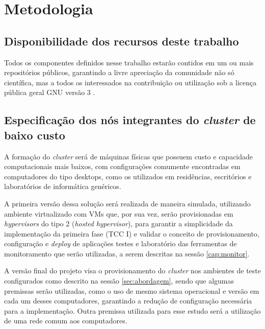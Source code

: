 
\chapter{Metodologia}
\label{chap:metodologia}
\section{Disponibilidade dos recursos deste trabalho}

Todos os componentes definidos nesse trabalho estarão contidos em um ou mais repositórios públicos, garantindo a livre apreciação da comunidade não só científica, mas a todos os interessados na contribuição ou utilização sob a licença pública geral GNU versão 3 \cite{foss2022}.

\section{Especificação dos nós integrantes do  \emph{cluster} de baixo custo}

A formação do  \emph{cluster} será de máquinas físicas que possuem custo e capacidade computacionais mais baixos, com configurações comumente encontradas em computadores do tipo desktops, como os utilizados em residências, escritórios e laboratórios de informática genéricos.

A primeira versão dessa solução será realizada de maneira simulada, utilizando ambiente virtualizado com VMs que, por sua vez, serão provisionadas em \emph{hypervisors} do tipo 2 \cite{comer_cloud_2021} (\emph{hosted} \emph{hypervisor}), para garantir a simplicidade da implementação da primeira fase (TCC I) e validar o conceito de provisionamento, configuração e \emph{deploy} de aplicações testes e laboratório das ferramentas de monitoramento que serão utilizadas, a serem descritas na sessão \ref{cap:monitor}. 

A versão final do projeto visa o provisionamento do  \emph{cluster} nos ambientes de teste configurados como descrito na sessão \ref{sec:abordagem}, sendo que algumas premissas serão utilizadas, como o uso de mesmo sistema operacional e versão em cada um desses computadores, garantindo a redução de configuração necessária para a implementação. Outra premissa utilizada para esse estudo será a utilização de uma rede comum aos computadores. 


